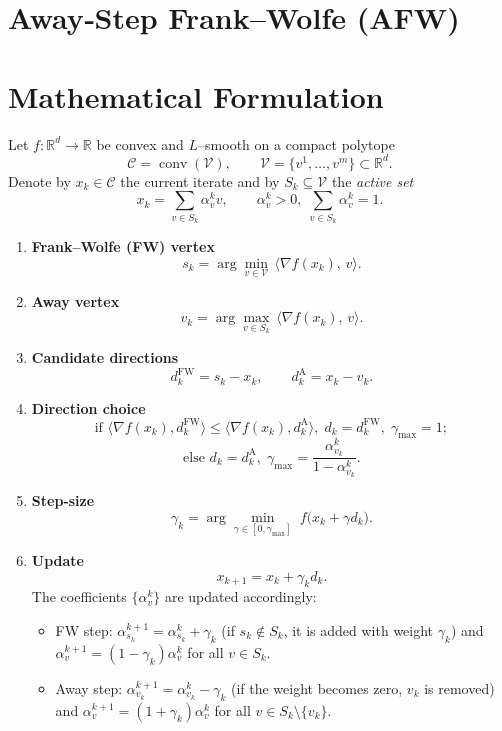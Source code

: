 \documentclass{article}
\newcommand{\R}{\mathbb{R}}
\newcommand{\C}{\mathcal{C}}
\newcommand{\V}{\mathcal{V}}
\begin{document}
\section*{Away‑Step Frank–Wolfe (AFW)}

\section*{Mathematical Formulation}
Let $f:\R^{d}\rightarrow\R$ be convex and $L$–smooth on a compact polytope 
\[
\C=\operatorname{conv}(\V),\qquad \V=\{v^{1},\dots ,v^{m}\}\subset\R^{d}.
\]
Denote by $x_{k}\in\C$ the current iterate and by $S_{k}\subseteq \V$ the \emph{active set}
\[
x_{k}= \sum_{v\in S_{k}}\alpha^{k}_{v}v,\qquad 
\alpha^{k}_{v}>0,\;\sum_{v\in S_{k}}\alpha^{k}_{v}=1 .
\]

\begin{enumerate}[label=\arabic*)]
\item \textbf{Frank–Wolfe (FW) vertex}
\[
s_{k}= \arg\min_{v\in\V}\,\langle \nabla f(x_{k}),\,v\rangle .
\]
\item \textbf{Away vertex}
\[
v_{k}= \arg\max_{v\in S_{k}}\,
\langle \nabla f(x_{k}),\,v\rangle .
\]
\item \textbf{Candidate directions}
\[
d^{\text{FW}}_{k}= s_{k}-x_{k},\qquad 
d^{\text{A}}_{k}= x_{k}-v_{k}.
\]
\item \textbf{Direction choice}
\[
\text{if }\langle \nabla f(x_{k}),d^{\text{FW}}_{k}\rangle\le
\langle \nabla f(x_{k}),d^{\text{A}}_{k}\rangle,
\;d_{k}=d^{\text{FW}}_{k},\;
\gamma_{\max}=1;
\]
\[
\text{else } d_{k}=d^{\text{A}}_{k},\;
\gamma_{\max}= \frac{\alpha^{k}_{v_{k}}}{1-\alpha^{k}_{v_{k}}}.
\]
\item \textbf{Step‑size}
\[
\gamma_{k}= \arg\min_{\gamma\in[0,\gamma_{\max}]}
\; f\bigl(x_{k}+ \gamma d_{k}\bigr) .
\]
\item \textbf{Update}
\[
x_{k+1}= x_{k}+ \gamma_{k} d_{k}.
\]
The coefficients $\{\alpha^{k}_{v}\}$ are updated accordingly:
\begin{itemize}
\item FW step: $\alpha^{k+1}_{s_{k}} = \alpha^{k}_{s_{k}}+\gamma_{k}$ (if $s_{k}\notin S_{k}$, it is added with weight $\gamma_{k}$) and $\alpha^{k+1}_{v}= (1-\gamma_{k})\alpha^{k}_{v}$ for all $v\in S_{k}$.
\item Away step: $\alpha^{k+1}_{v_{k}} = \alpha^{k}_{v_{k}}-\gamma_{k}$ (if the weight becomes zero, $v_{k}$ is removed) and $\alpha^{k+1}_{v}= (1+\gamma_{k})\alpha^{k}_{v}$ for all $v\in S_{k}\setminus\{v_{k}\}$.
\end{itemize}
\end{enumerate}
\end{document}
